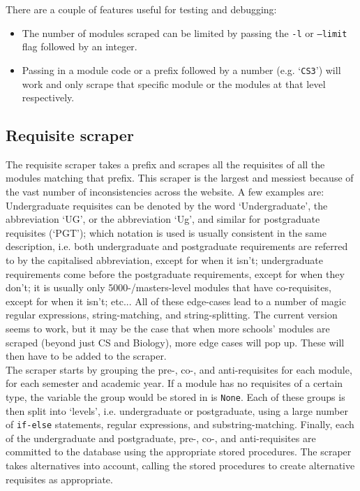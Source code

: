     There are a couple of features useful for testing and debugging:
    \begin{itemize}
        \item The number of modules scraped can be limited by passing the
              \texttt{-l} or \texttt{--limit} flag followed by an integer.
        \item Passing in a module code or a prefix followed by a number (e.g.
              `\texttt{CS3}') will work and only scrape that specific module or
              the modules at that level respectively.
    \end{itemize}
    
    \subsection{Requisite scraper}
    The requisite scraper takes a prefix and scrapes all the requisites of all
    the modules matching that prefix. This scraper is the largest and messiest
    because of the vast number of inconsistencies across the website. A few
    examples are: Undergraduate requisites can be denoted by the word
    `Undergraduate', the abbreviation `UG', or the abbreviation `Ug', and
    similar for postgraduate requisites (`PGT'); which notation is used is
    usually consistent in the same description, i.e. both undergraduate and
    postgraduate requirements are referred to by the capitalised abbreviation,
    except for when it isn't; undergraduate requirements come before the
    postgraduate requirements, except for when they don't; it is usually only
    5000-/masters-level modules that have co-requisites, except for when it
    isn't; etc... All of these edge-cases lead to a number of magic regular
    expressions, string-matching, and string-splitting. The current version
    seems to work, but it may be the case that when more schools' modules are
    scraped (beyond just CS and Biology), more edge cases will pop up. These
    will then have to be added to the scraper.
    \\
    
    The scraper starts by grouping the pre-, co-, and anti-requisites for each
    module, for each semester and academic year. If a module has no requisites
    of a certain type, the variable the group would be stored in is
    \texttt{None}. Each of these groups is then split into `levels', i.e.
    undergraduate or postgraduate, using a large number of \texttt{if-else}
    statements, regular expressions, and substring-matching. Finally, each of
    the undergraduate and postgraduate, pre-, co-, and anti-requisites are
    committed to the database using the appropriate stored procedures. The
    scraper takes alternatives into account, calling the stored procedures to
    create alternative requisites as appropriate.
